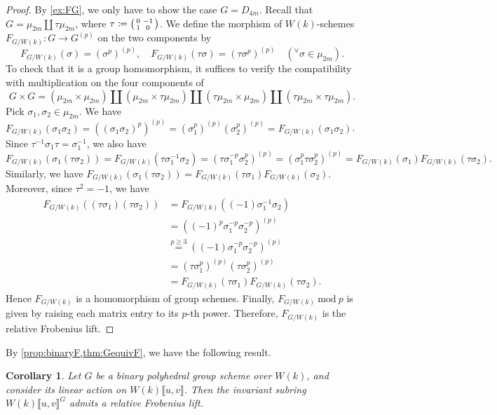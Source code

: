 \documentclass[uplatex,11pt,a4paper]{amsart} %
\numberwithin{equation}{section}
\numberwithin{figure}{section}
\numberwithin{table}{section}
\theoremstyle{plain}
\newtheorem{corollary}[theorem]{Corollary}
\theoremstyle{definition}
\newenvironment{psmatrix}{\left(\begin{smallmatrix}}{\end{smallmatrix}\right)}
\begin{document}
\begin{proof}
By \cref{ex:FG}, we only have to show the case $G=D_{4m}$. 
Recall that $G=\mu_{2m}\coprod \tau\mu_{2m}$, where $\tau\coloneqq\begin{psmatrix}0 & -1 \\ 1 & 0 \end{psmatrix}$. We define the morphism of $W(k)$-schemes $F_{G/W(k)}\colon G\to G^{(p)}$ on the two components by
\[
F_{G/W(k)}(\sigma)=\left(\sigma^p\right)^{(p)},\quad F_{G/W(k)}(\tau\sigma)=\left(\tau\sigma^p\right)^{(p)}\quad ({}^\forall \sigma\in\mu_{2m}).
\]
To check that it is a group homomorphism, it suffices to verify the compatibility with multiplication on the four components of
\[
G\times G = \left( \mu_{2m}\times\mu_{2m}\right) \coprod \left( \mu_{2m}\times \tau\mu_{2m}\right) \coprod \left( \tau\mu_{2m}\times\mu_{2m}\right) \coprod \left(\tau\mu_{2m}\times\tau\mu_{2m}\right).
\]
Pick $\sigma_1,\sigma_2\in \mu_{2m}$. We have $F_{G/W(k)}(\sigma_1\sigma_2) = \left((\sigma_1\sigma_2)^p\right)^{(p)} = \left(\sigma_1^p\right)^{(p)} \left(\sigma_2^p\right)^{(p)} = F_{G/W(k)}(\sigma_1\sigma_2)$.
Since $\tau^{-1}\sigma_1\tau=\sigma_1^{-1}$, we also have
\[
F_{G/W(k)}(\sigma_1(\tau\sigma_2)) = F_{G/W(k)}(\tau\sigma_1^{-1}\sigma_2) = \left(\tau \sigma_1^{-p}\sigma_2^p\right)^{(p)} = \left(\sigma_1^p\tau\sigma_2^p\right)^{(p)} = F_{G/W(k)}(\sigma_1)F_{G/W(k)}(\tau\sigma_2).
\]
Similarly, we have $F_{G/W(k)}(\sigma_1(\tau\sigma_2)) = F_{G/W(k)}(\tau\sigma_1)F_{G/W(k)}(\sigma_2)$. Moreover, since $\tau^2=-1$, we have
\begin{align*}
F_{G/W(k)}((\tau\sigma_1)(\tau\sigma_2)) &= F_{G/W(k)}((-1)\sigma_1^{-1}\sigma_2) \\
&= \left((-1)^p\sigma_1^{-p}\sigma_2^{-p}\right)^{(p)} \\
&\stackrel{p\geq 3}{=} \left((-1)\sigma_1^{-p}\sigma_2^{-p}\right)^{(p)} \\
&= \left(\tau\sigma_1^p\right)^{(p)} \left(\tau\sigma_2^p\right)^{(p)} \\
&= F_{G/W(k)}(\tau\sigma_1)F_{G/W(k)}(\tau\sigma_2).
\end{align*}
Hence $F_{G/W(k)}$ is a homomorphism of group schemes. Finally, $F_{G/W(k)}\ \mathrm{mod}\ p$ is given by raising each matrix entry to its $p$-th power. Therefore, $F_{G/W(k)}$ is the relative Frobenius lift.
\end{proof}

By \cref{prop:binaryF,thm:GequivF}, we have the following result.

\begin{corollary}
\label{cor:RDPphi}
Let $G$ be a binary polyhedral group scheme over $W(k)$, and consider its linear action on $W(k)\llbracket u,v\rrbracket$. Then the invariant subring $W(k)\llbracket u,v\rrbracket^G$ admits a relative Frobenius lift.
\end{corollary}
\end{document}
